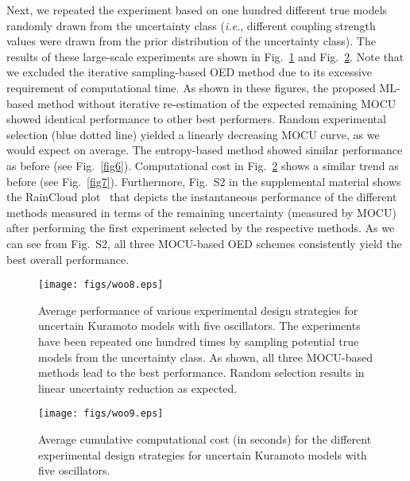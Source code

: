 \documentclass{article}
\begin{document}
Next, we repeated the experiment based on one hundred different true models randomly drawn from the uncertainty class (\textit{i.e.}, different coupling strength values were drawn from the prior distribution of the uncertainty class). The results of these large-scale experiments are shown in Fig.~\ref{fig8} and Fig.~\ref{fig9}. Note that we excluded the iterative sampling-based OED method due to its excessive requirement of computational time. As shown in these figures, the proposed ML-based method without iterative re-estimation of the expected remaining MOCU showed identical performance to other best performers. Random experimental selection (blue dotted line) yielded a linearly decreasing MOCU curve, as we would expect on average. The entropy-based method showed similar performance as before (see Fig.~\ref{fig6}). Computational cost in Fig.~\ref{fig9} shows a similar trend as before (see Fig.~\ref{fig7}). Furthermore, Fig.~S2 in the supplemental material shows the RainCloud plot~\cite{allen2019raincloud} that depicts the instantaneous performance of the different methods measured in terms of the remaining uncertainty (measured by MOCU) after performing the first experiment selected by the respective methods. As we can see from Fig.~S2, all three MOCU-based OED schemes consistently yield the best overall performance.
\begin{figure}
\centering
\texttt{[image: figs/woo8.eps]}
\caption{Average performance of various experimental design strategies for uncertain Kuramoto models with five oscillators. The experiments have been repeated one hundred times by sampling potential true models from the uncertainty class. As shown, all three MOCU-based methods lead to the best performance. Random selection results in linear uncertainty reduction as expected.}
\label{fig8}
\end{figure}
\begin{figure}
\centering
\texttt{[image: figs/woo9.eps]}
\caption{Average cumulative computational cost (in seconds) for the different experimental design strategies for uncertain Kuramoto models with five oscillators.}
\label{fig9}
\end{figure}
\end{document}
